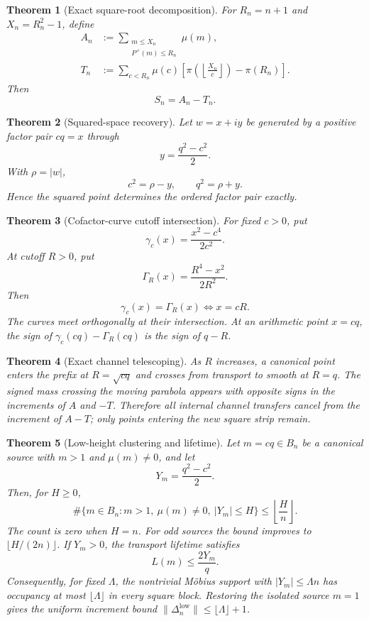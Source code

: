 \documentclass[11pt]{article}
\newtheorem{theorem}{Theorem}[section]
\theoremstyle{definition}
\theoremstyle{remark}
\newcommand{\Pplus}{P^{+}}
\newcommand{\1}{\mathbf{1}}
\begin{document}
\begin{theorem}[Exact square-root decomposition]
\label{thm:intro-decomposition}
For $R_n=n+1$ and $X_n=R_n^2-1$, define
\begin{align*}
 A_n&:=\sum_{\substack{m\le X_n\\\Pplus(m)\le R_n}}\mu(m),\\
 T_n&:=\sum_{c<R_n}\mu(c)
 \left[
 \pi\!\left(\left\lfloor\frac{X_n}{c}\right\rfloor\right)-\pi(R_n)
 \right].
\end{align*}
Then
\[
 \boxed{S_n=A_n-T_n.}
\]
\end{theorem}

\begin{theorem}[Squared-space recovery]
\label{thm:intro-recovery}
Let $w=x+iy$ be generated by a positive factor pair $cq=x$ through
\[
 y=\frac{q^2-c^2}{2}.
\]
With $\rho=|w|$,
\[
 \boxed{c^2=\rho-y,\qquad q^2=\rho+y.}
\]
Hence the squared point determines the ordered factor pair exactly.
\end{theorem}

\begin{theorem}[Cofactor-curve cutoff intersection]
\label{thm:intro-intersection}
For fixed $c>0$, put
\[
 \gamma_c(x)=\frac{x^2-c^4}{2c^2}.
\]
At cutoff $R>0$, put
\[
 \Gamma_R(x)=\frac{R^4-x^2}{2R^2}.
\]
Then
\[
 \boxed{\gamma_c(x)=\Gamma_R(x)\iff x=cR.}
\]
The curves meet orthogonally at their intersection.  At an arithmetic point $x=cq$, the sign of $\gamma_c(cq)-\Gamma_R(cq)$ is the sign of $q-R$.
\end{theorem}

\begin{theorem}[Exact channel telescoping]
\label{thm:intro-telescoping}
As $R$ increases, a canonical point enters the prefix at $R=\sqrt{cq}$ and crosses from transport to smooth at $R=q$.  The signed mass crossing the moving parabola appears with opposite signs in the increments of $A$ and $-T$.  Therefore all internal channel transfers cancel from the increment of $A-T$; only points entering the new square strip remain.
\end{theorem}

\begin{theorem}[Low-height clustering and lifetime]
\label{thm:intro-low}
Let $m=cq\in B_n$ be a canonical source with $m>1$ and $\mu(m)\ne0$, and let
\[
 Y_m=\frac{q^2-c^2}{2}.
\]
Then, for $H\ge0$,
\[
 \#\{m\in B_n:m>1,\ \mu(m)\ne0,\ |Y_m|\le H\}
 \le\left\lfloor\frac{H}{n}\right\rfloor.
\]
The count is zero when $H=n$.  For odd sources the bound improves to
$\lfloor H/(2n)\rfloor$.
If $Y_m>0$, the transport lifetime satisfies
\[
 L(m)\le\frac{2Y_m}{q}.
\]
Consequently, for fixed $\Lambda$, the nontrivial M\"obius support with
$|Y_m|\le\Lambda n$ has occupancy at most $\lfloor\Lambda\rfloor$ in every
square block.  Restoring the isolated source $m=1$ gives the uniform increment
bound $\|\Delta_n^{\mathrm{low}}\|\le\lfloor\Lambda\rfloor+1$.
\end{theorem}
\end{document}
